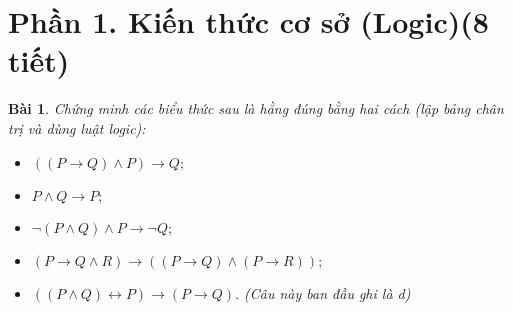 \documentclass[11pt, oneside, a4paper]{article}
\newtheorem{bt}{Bài}[section]
\begin{document}
\newpage

\section[Phần 1. Kiến thức cơ sở (Logic)(8 tiết)]{ Phần 1. Kiến thức cơ sở (Logic)(8 tiết)}
\begin{bt}
    Chứng minh các biểu thức sau là hằng đúng bằng hai cách (lập bảng chân trị và dùng luật logic): 
     \begin{itemize}
     \item[a)] $((P \rightarrow Q) \land P) \rightarrow Q;$ 
     \item[b)] $P \land Q \rightarrow P;$ 
     \item[c)] $\lnot (P \land Q) \land P \rightarrow \lnot Q;$
     \item[d)] $(P \rightarrow Q \land R) \rightarrow ((P \rightarrow Q) \land (P \rightarrow R));$ 
     \item[e)] $((P \land Q) \leftrightarrow P) \rightarrow (P \rightarrow Q).$ (Câu này ban đầu ghi là d)
     \end{itemize}
    \end{bt}
    
\end{document}
